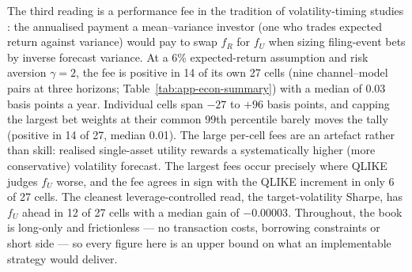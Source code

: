 The third reading is a performance fee in the tradition of volatility-timing studies \cite{fleming2001timing}: the annualised payment a mean--variance investor (one who trades expected return against variance) would pay to swap $f_R$ for $f_U$ when sizing filing-event bets by inverse forecast variance. At a 6\% expected-return assumption and risk aversion $\gamma = 2$, the fee is positive in 14 of its own 27 cells (nine channel--model pairs at three horizons; Table~\ref{tab:app-econ-summary}) with a median of 0.03 basis points a year. %
Individual cells span $-27$ to $+96$ basis points, and capping the largest bet weights at their common 99th percentile barely moves the tally (positive in 14 of 27, median 0.01). %
The large per-cell fees are an artefact rather than skill: realised single-asset utility rewards a systematically higher (more conservative) volatility forecast. The largest fees occur precisely where QLIKE judges $f_U$ worse, and the fee agrees in sign with the QLIKE increment in only 6 of 27 cells. %
The cleanest leverage-controlled read, the target-volatility Sharpe, has $f_U$ ahead in 12 of 27 cells with a median gain of $-0.00003$. %
Throughout, the book is long-only and frictionless --- no transaction costs, borrowing constraints or short side --- so every figure here is an upper bound on what an implementable strategy would deliver. %

